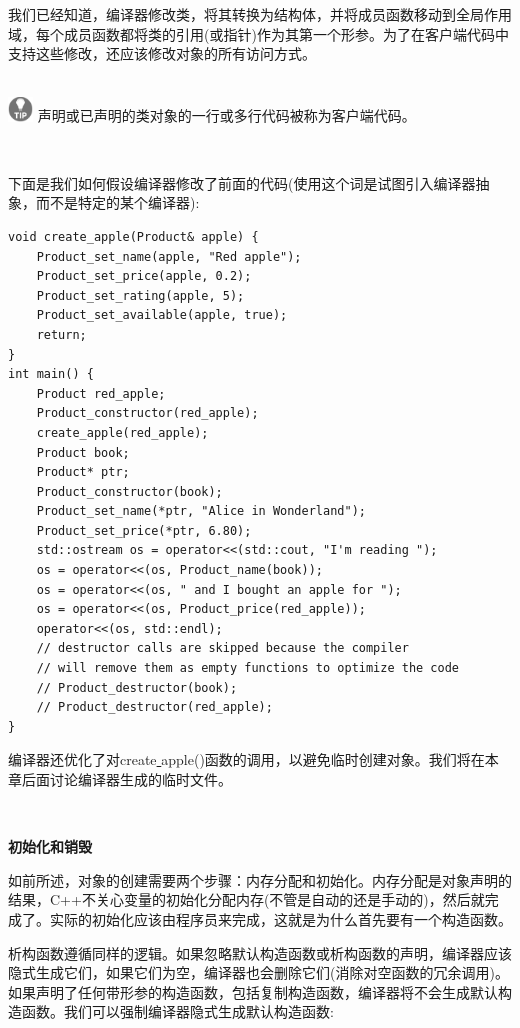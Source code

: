 我们已经知道，编译器修改类，将其转换为结构体，并将成员函数移动到全局作用域，每个成员函数都将类的引用(或指针)作为其第一个形参。为了在客户端代码中支持这些修改，还应该修改对象的所有访问方式。 \par

\hspace*{\fill} \\ %
\includegraphics[width=0.05\textwidth]{images/tip}
声明或已声明的类对象的一行或多行代码被称为客户端代码。\par
\noindent\textbf{}\ \par

下面是我们如何假设编译器修改了前面的代码(使用这个词是试图引入编译器抽象，而不是特定的某个编译器):\par

\begin{lstlisting}[caption={}]
void create_apple(Product& apple) {
	Product_set_name(apple, "Red apple");
	Product_set_price(apple, 0.2);
	Product_set_rating(apple, 5);
	Product_set_available(apple, true);
	return;
}
int main() {
	Product red_apple;
	Product_constructor(red_apple);
	create_apple(red_apple);
	Product book;
	Product* ptr;
	Product_constructor(book);
	Product_set_name(*ptr, "Alice in Wonderland");
	Product_set_price(*ptr, 6.80);
	std::ostream os = operator<<(std::cout, "I'm reading ");
	os = operator<<(os, Product_name(book));
	os = operator<<(os, " and I bought an apple for ");
	os = operator<<(os, Product_price(red_apple));
	operator<<(os, std::endl);
	// destructor calls are skipped because the compiler
	// will remove them as empty functions to optimize the code
	// Product_destructor(book);
	// Product_destructor(red_apple);
}
\end{lstlisting}

编译器还优化了对create\underline{ }apple()函数的调用，以避免临时创建对象。我们将在本章后面讨论编译器生成的临时文件。\par

\noindent\textbf{}\ \par
\textbf{初始化和销毁} \ \par
如前所述，对象的创建需要两个步骤：内存分配和初始化。内存分配是对象声明的结果，C++不关心变量的初始化分配内存(不管是自动的还是手动的)，然后就完成了。实际的初始化应该由程序员来完成，这就是为什么首先要有一个构造函数。 \par
析构函数遵循同样的逻辑。如果忽略默认构造函数或析构函数的声明，编译器应该隐式生成它们，如果它们为空，编译器也会删除它们(消除对空函数的冗余调用)。如果声明了任何带形参的构造函数，包括复制构造函数，编译器将不会生成默认构造函数。我们可以强制编译器隐式生成默认构造函数: \par

